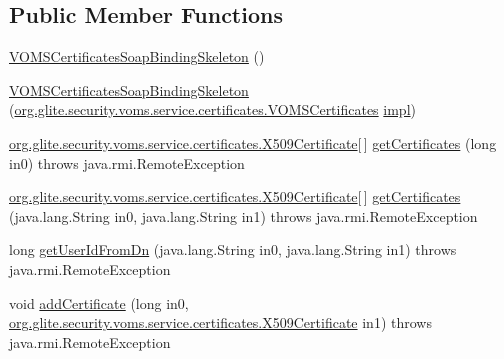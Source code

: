 \subsection*{Public Member Functions}
\begin{DoxyCompactItemize}
\item 
\hyperlink{classorg_1_1glite_1_1security_1_1voms_1_1service_1_1certificates_1_1VOMSCertificatesSoapBindingSkeleton_aea19eb702b8a2716732b07be4aa02f12}{VOMSCertificatesSoapBindingSkeleton} ()
\item 
\hyperlink{classorg_1_1glite_1_1security_1_1voms_1_1service_1_1certificates_1_1VOMSCertificatesSoapBindingSkeleton_a79fa76ca7dfb0b772a88c45a3c32b81e}{VOMSCertificatesSoapBindingSkeleton} (\hyperlink{interfaceorg_1_1glite_1_1security_1_1voms_1_1service_1_1certificates_1_1VOMSCertificates}{org.glite.security.voms.service.certificates.VOMSCertificates} \hyperlink{classorg_1_1glite_1_1security_1_1voms_1_1service_1_1certificates_1_1VOMSCertificatesSoapBindingSkeleton_a2d621dce09a90972e8409a0dc9936638}{impl})
\item 
\hyperlink{classorg_1_1glite_1_1security_1_1voms_1_1service_1_1certificates_1_1X509Certificate}{org.glite.security.voms.service.certificates.X509Certificate}\mbox{[}$\,$\mbox{]} \hyperlink{classorg_1_1glite_1_1security_1_1voms_1_1service_1_1certificates_1_1VOMSCertificatesSoapBindingSkeleton_a6a97f05ced20cebedabf41dfc912155d}{getCertificates} (long in0)  throws java.rmi.RemoteException     
\item 
\hyperlink{classorg_1_1glite_1_1security_1_1voms_1_1service_1_1certificates_1_1X509Certificate}{org.glite.security.voms.service.certificates.X509Certificate}\mbox{[}$\,$\mbox{]} \hyperlink{classorg_1_1glite_1_1security_1_1voms_1_1service_1_1certificates_1_1VOMSCertificatesSoapBindingSkeleton_a3a4f9ea0883f5cfcb2883698d0aaef37}{getCertificates} (java.lang.String in0, java.lang.String in1)  throws java.rmi.RemoteException     
\item 
long \hyperlink{classorg_1_1glite_1_1security_1_1voms_1_1service_1_1certificates_1_1VOMSCertificatesSoapBindingSkeleton_af207a05ee8f0677ee3cb645b48b85165}{getUserIdFromDn} (java.lang.String in0, java.lang.String in1)  throws java.rmi.RemoteException     
\item 
void \hyperlink{classorg_1_1glite_1_1security_1_1voms_1_1service_1_1certificates_1_1VOMSCertificatesSoapBindingSkeleton_a6ccdc7a1abed389c6b78f0ede61da218}{addCertificate} (long in0, \hyperlink{classorg_1_1glite_1_1security_1_1voms_1_1service_1_1certificates_1_1X509Certificate}{org.glite.security.voms.service.certificates.X509Certificate} in1)  throws java.rmi.RemoteException     

\end{DoxyCompactItemize}
